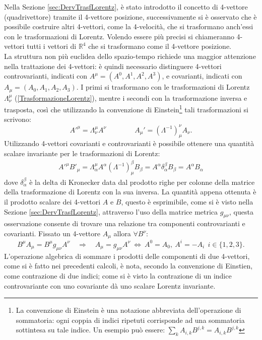 
Nella Sezione \ref{sec:DervTrasfLorentz}, è stato introdotto il concetto di 4-vettore (quadrivettore) tramite il 4-vettore posizione, successivamente si è osservato che è possibile costruire altri 4-vettori, come la 4-velocità, che si trasformano anch'essi con le trasformazioni di Lorentz. Volendo essere più precisi si chiameranno 4-vettori tutti i vettori di $\mathbb{R}^4$ che si trasformano come il 4-vettore posizione.\\ 
La struttura non più euclidea dello spazio-tempo richiede una maggior attenzione nella trattazione dei 4-vettori: è quindi necessario distinguere 4-vettori controvarianti, indicati con $A^{\mu}=(A^0,A^1,A^2,A^3)$, e covarianti, indicati con $A_{\mu}=(A_0,A_1,A_2,A_3)$. I primi si trasformano con le trasformazioni di Lorentz $\Lambda_\nu^\mu$ (\ref{TrasformazioneLorentz}), mentre i secondi con la trasformazione inversa e trasposta, così che utilizzando la convenzione di Einstein\footnote{La convenzione di Einstein è una notazione abbreviata dell'operazione di sommatoria: ogni coppia di indici ripetuti corrisponde ad una sommatoria sottintesa su tale indice. Un esempio può essere: $\sum_k A_{i,k}B^{j,k}= A_{i,k}B^{j,k}$} tali trasformazioni si scrivono:
\begin{equation}
    A'^\mu =\Lambda_\nu^\mu A^\nu \qquad \qquad A_\mu '=(\Lambda^{-1} )^\nu_\mu A_\nu.
\end{equation}
Utilizzando 4-vettori covarianti e controvarianti è possibile ottenere una quantità scalare invariante per le trasformazioni di Lorentz:
\begin{eqnarray*}
    A'^\mu B'_\mu=\Lambda_\alpha^\mu A^\alpha (\Lambda^{-1} )^\beta_\mu B_\beta=A^\alpha \delta_\alpha^\beta B_\beta=A^\alpha B_\alpha
\end{eqnarray*}
dove $ \delta_\alpha^\beta$ è la delta di Kronecker data dal prodotto righe per colonne della matrice della trasformazione di Lorentz con la sua inversa. La quantità appena ottenuta è il prodotto scalare dei 4-vettori $A$ e $B$, questo è esprimibile, come si è visto nella Sezione \ref{sec:DervTrasfLorentz}, attraverso l'uso della matrice metrica $g_{\mu \nu}$, questa osservazione consente di trovare una relazione tra componenti controvarianti e covarianti. Fissato un 4-vettore $A_\mu$ allora $\forall B^\nu$: 
\begin{equation}
    B^\mu A_\mu=B^\mu g_{\mu\nu} A^\nu \quad \Rightarrow\quad A_\mu=g_{\mu\nu}A^\nu \ \Leftrightarrow\ A^0=A_0,\ A^i=-A_i \ \ i\in\{1,2,3\}.
\end{equation}
L'operazione algebrica di sommare i prodotti delle componenti di due 4-vettori, come si è fatto nei precedenti calcoli, è nota, secondo la convenzione di Einstien, come contrazione di due indici; come si è visto la contrazione di un indice controvariante con uno covariante dà uno scalare Lorentz invariante.\\

